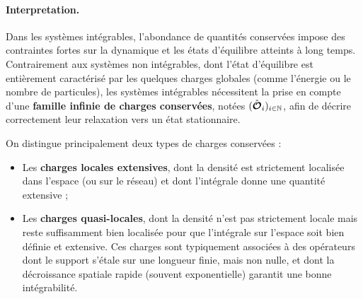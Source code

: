 	
\paragraph{Interpretation.}
Dans les systèmes intégrables, l'abondance de quantités conservées impose des contraintes fortes sur la dynamique et les états d'équilibre atteints à long temps. Contrairement aux systèmes non intégrables, dont l’état d’équilibre est entièrement caractérisé par les quelques charges globales (comme l’énergie ou le nombre de particules), les systèmes intégrables nécessitent la prise en compte d’une {\bf famille infinie de  charges conservées}, notées $(\hat{\bm{\mathcal{O}}}_i)_{i\in \mathbb{N}}$, afin de décrire correctement leur relaxation vers un état stationnaire.

On distingue principalement deux types de charges conservées :
\begin{itemize}[label = $\bullet$]
	\item Les {\bf charges locales extensives}, dont la densité est strictement localisée dans l’espace (ou sur le réseau) et dont l’intégrale donne une quantité extensive ;
	\item Les {\bf charges quasi-locales}, dont la densité n’est pas strictement locale mais reste suffisamment bien localisée pour que l’intégrale sur l’espace soit bien définie et extensive. Ces charges sont typiquement associées à des opérateurs dont le support s'étale sur une longueur finie, mais non nulle, et dont la décroissance spatiale rapide (souvent exponentielle) garantit une bonne intégrabilité.
\end{itemize}


